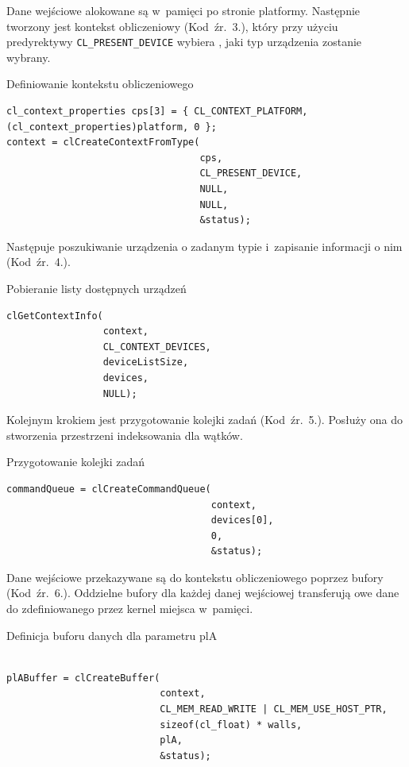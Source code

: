 Dane wejściowe alokowane są w~pamięci po stronie platformy. Następnie tworzony jest kontekst obliczeniowy (Kod~źr.~3.), który przy użyciu predyrektywy \verb|CL_PRESENT_DEVICE| wybiera , jaki typ urządzenia zostanie wybrany.

\begin{program}[H]
\caption{Definiowanie kontekstu obliczeniowego}
\begin{lstlisting}
cl_context_properties cps[3] = { CL_CONTEXT_PLATFORM, (cl_context_properties)platform, 0 };
context = clCreateContextFromType(
                                  cps, 
                                  CL_PRESENT_DEVICE, 
                                  NULL, 
                                  NULL, 
                                  &status);
\end{lstlisting}
\end{program}

Następuje poszukiwanie urządzenia o zadanym typie i~zapisanie informacji o nim (Kod~źr.~4.).

\begin{program}[H]
\caption{Pobieranie listy dostępnych urządzeń}
\begin{lstlisting}
clGetContextInfo(
                 context, 
                 CL_CONTEXT_DEVICES, 
                 deviceListSize, 
                 devices, 
                 NULL);

\end{lstlisting}
\end{program}

Kolejnym krokiem jest przygotowanie kolejki zadań (Kod~źr.~5.). Posłuży ona do stworzenia przestrzeni indeksowania dla wątków.

\begin{program}[H]
\caption{Przygotowanie kolejki zadań}
\begin{lstlisting}
commandQueue = clCreateCommandQueue(
                                    context, 
                                    devices[0], 
                                    0, 
                                    &status);
\end{lstlisting}
\end{program}

Dane wejściowe przekazywane są do kontekstu obliczeniowego poprzez bufory (Kod~źr.~6.). Oddzielne bufory dla każdej danej wejściowej transferują owe  dane do zdefiniowanego przez kernel miejsca w~pamięci. 

\begin{program}[H]
\caption{Definicja buforu danych dla parametru plA}
\begin{lstlisting}

plABuffer = clCreateBuffer(
                           context, 
                           CL_MEM_READ_WRITE | CL_MEM_USE_HOST_PTR,
                           sizeof(cl_float) * walls,
                           plA, 
                           &status);
\end{lstlisting}
\end{program}


